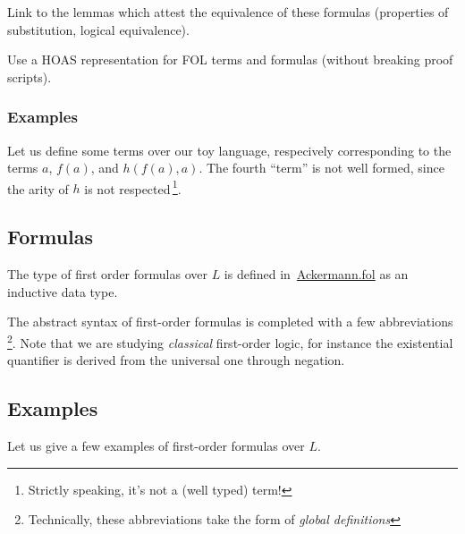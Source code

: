 
  \begin{todo}
   Link to the lemmas which attest the equivalence of these formulas (properties of substitution, logical equivalence).
  \end{todo}


  \begin{project}
 Use a HOAS representation for FOL terms and formulas (without breaking proof scripts).   
  \end{project}

\subsubsection{Examples}
\label{sect:folTermExamples}

Let us define some \gallina terms over our toy language, respecively corresponding to the terms $a$,
$f(a)$, and $h(f(a),a)$. The fourth ``term'' is not well formed, since the arity of $h$ is not respected\,\footnote{Strictly speaking, it's not a (well typed) term!}.




\subsection{Formulas}



The type of first order formulas over $L$ is defined 
in~\href{../theories/html/hydras.Ackermann.fol.html}{Ackermann.fol} as an inductive data type.


The  abstract syntax of first-order formulas is completed 
with a few abbreviations\,\footnote{Technically, these abbreviations take the form of \emph{global definitions}}. Note that we are studying \emph{classical} first-order logic, for instance the existential quantifier is derived from the universal one through negation. 


\subsection{Examples}




Let us give a few examples of first-order formulas over $L$.

